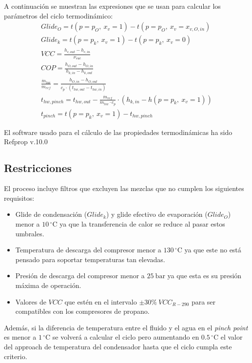\documentclass[../main.tex]{subfiles}
\begin{document}
A continuación se muestran las expresiones que se usan para calcular los 
parámetros del ciclo termodinámico:
\begin{gather}
Glide_{O}=t(p = p_{O},\ x_{v} = 1) - t(p = p_{O},\ x_{v} = x_{v,O,in})
\label{eq:glide_O}
\\
Glide_{k}=t(p = p_{k},\ x_{v} = 1) - t(p = p_{k},\ x_{v} = 0)
\label{eq:glide_k}
\\
VCC = \frac{h_{c,out} - h_{c,in}}{\nu_{suc}}
\label{eq:VCC}
\\
COP = \frac{h_{O,out}-h_{O,in}}{h_{k,in}-h_{k,out}}
\label{eq:COP}
\\
\frac{\dot{m}_{hw}}{\dot{m}_{ref}}=\frac{h_{O,in}-h_{O,out}}
{c_{p}\cdot \left( t_{hw,out}-t_{hw,in} \right)}
\label{eq:caudales}
\\
t_{hw,pinch} = t_{hw,out} - \frac{\dot{m}_{ref}}{\dot{m}_{hw}\cdot c_{p}} \cdot 
\left( h_{k,in} - h(p = p_{k},\ x_{v} = 1)\right)
\label{eq:t_hw_pinch}
\\
t_{pinch} = t(p = p_{k},\ x_{v} = 1) - t_{hw,pinch}
\label{t_pinch}
\end{gather}

El software usado para el cálculo de las propiedades termodinámicas 
ha sido Refprop v.10.0 \cite{refprop}
\subsection{Restricciones}
El proceso incluye filtros que excluyen las mezclas que no cumplen los 
siguientes requisitos:
\begin{itemize}
    \item Glide de condensación ($Glide_{k}$) y glide efectivo de evaporación 
    ($Glide_{O}$) menor a $10\,^{\circ}\mathrm{C}$ ya que la transferencia de 
    calor se reduce al pasar estos umbrales.
    \item Temperatura de descarga del compresor menor a $130\,^{\circ}\mathrm{C}$
    ya que este no está pensado para soportar temperaturas tan elevadas.
    \item Presión de descarga del compresor menor a $25\ \mathrm{bar}$ ya que esta es
    su presión máxima de operación.
    \item Valores de $VCC$ que estén en el intervalo $\pm 30\%\ VCC_{R-290}$  
    para ser compatibles con los compresores de propano.
\end{itemize}
Además, si la diferencia de temperatura entre el fluido y el agua en el 
\textit{pinch point} es menor a $1\,^{\circ}\mathrm{C}$
se volverá a calcular el ciclo pero aumentando en $0.5\,^{\circ}\mathrm{C}$ el 
valor del approach de temperatura del condensador hasta que el ciclo cumpla 
este criterio.
\end{document}

